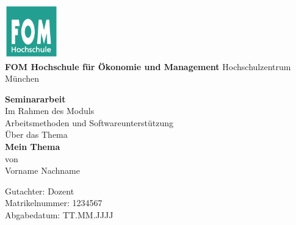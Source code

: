 \documentclass[11pt]{article}
\begin{document}
\begin{center}
	\includegraphics[width=2.3cm]{assets/fomLogo.pdf}\\
	\textbf{FOM Hochschule für Ökonomie und Management}
	\newline
	\newline
	Hochschulzentrum München
\end{center}


\begin{center}
	\textbf{Seminararbeit}\\
	Im Rahmen des Moduls\\
	Arbeitsmethoden und Softwareunterstützung\\
	Über das Thema\\
	\textbf{Mein Thema}\\
	von\\
	Vorname Nachname\\
\end{center}

\begin{flushleft}
			                        
	Gutachter: Dozent       \\
	Matrikelnummer: 1234567 \\ 
	Abgabedatum: TT.MM.JJJJ \\
\end{flushleft}
		
	
\end{document}
